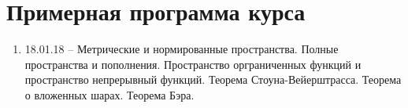 \documentclass[functional-analysis_17-18.tex]{subfiles}
\begin{document}
	\section{Примерная программа курса}
	\begin{enumerate}
        \item 18.01.18 -- Метрические и нормированные пространства. Полные пространства и пополнения. Пространство орграниченных функций и пространство непрерывный функций. Теорема Стоуна-Вейерштрасса. Теорема о вложенных шарах. Теорема Бэра.
        
    \end{enumerate}
	
\end{document}
